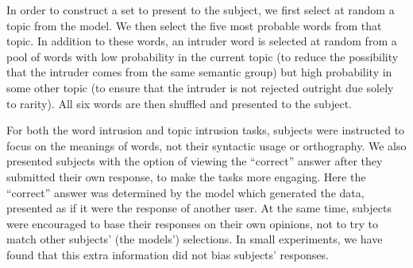 

In order to construct a set to present to the subject, we first select
at random a topic from the model.  We then select the five most probable
words from that topic.  In addition to these words, an intruder word
is selected at random from a pool of words with low probability in the
current topic (to reduce the possibility that the intruder comes from
the same semantic group) but high probability in some other topic (to
ensure that the intruder is not rejected outright due solely to
rarity).  All six words are then shuffled and presented to the subject.



For both the word intrusion and topic intrusion tasks, subjects were
instructed to focus on the meanings of words, not their syntactic
usage or orthography.  We also presented subjects with the option of
viewing the ``correct'' answer after they submitted their own
response, to make the tasks more engaging.  Here the ``correct''
answer was determined by the model which generated the data, presented
as if it were the response of another user.  At the same time,
subjects were encouraged to base their responses on their own
opinions, not to try to match other subjects' (the models')
selections.  In small experiments, we have found that this extra
information did not bias subjects' responses.

